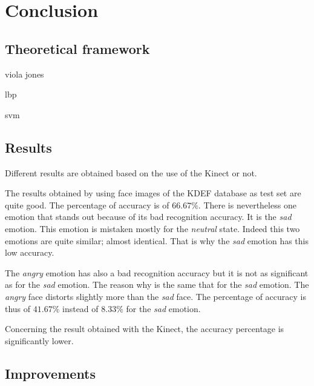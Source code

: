 \chapter{Conclusion}
\label{chap:ccl}
  
\section{Theoretical framework}

\vspace{\baselineskip}
\noindent viola jones
\newline

\noindent lbp
\newline

\noindent svm
\newline

\section{Results}

\vspace{\baselineskip}
\noindent Different results are obtained based on the use of the Kinect or not.
\newline

\noindent The results obtained by using face images of the KDEF database as test set are quite good. The percentage of accuracy is of $ 66.67\% $. There is nevertheless one emotion that stands out because of its bad recognition accuracy. It is the \textit{sad} emotion. This emotion is mistaken mostly for the \textit{neutral} state. Indeed this two emotions are quite similar; almost identical. That is why the \textit{sad} emotion has this low accuracy.
\newline

\noindent The \textit{angry} emotion has also a bad recognition accuracy but it is not as significant as for the \textit{sad} emotion. The reason why is the same that for the \textit{sad} emotion. The \textit{angry} face distorts slightly more than the \textit{sad} face. The percentage of accuracy is thus of $ 41.67\% $ instead of $ 8.33\% $ for the \textit{sad} emotion.
\newline

\noindent Concerning the result obtained with the Kinect, the accuracy percentage is significantly lower.
\newline

\section{Improvements}

